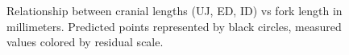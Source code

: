\documentclass[12pt]{article}\usepackage[]{graphicx}\usepackage[]{color}
\begin{document}
\begin{figure}[htb]

 \hfill{}

\caption{Relationship between cranial lengths (UJ, ED, ID) vs fork length in millimeters. Predicted points represented by black circles, measured values colored by residual scale.}\label{fig:figure2}
\end{figure}
\end{document}
